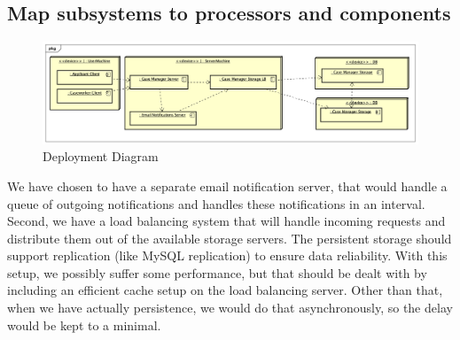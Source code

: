 \newpage
\subsection{Map subsystems to processors and components}
\begin{figure}[htb!]
    \centering
    \includegraphics[width=\textwidth]{img/pkg-deployment-diagram.png}
    \caption{Deployment Diagram}
\end{figure}

We have chosen to have a separate email notification server, that would handle a queue of outgoing notifications and handles these notifications in an interval.
Second, we have a load balancing system that will handle incoming requests and distribute them out of the available storage servers. 
The persistent storage should support replication (like MySQL replication) to ensure data reliability.
With this setup, we possibly suffer some performance, but that should be dealt with by including an efficient cache setup on the load balancing server. Other than that, when we have actually persistence, we would do that asynchronously, so the delay would be kept to a minimal.